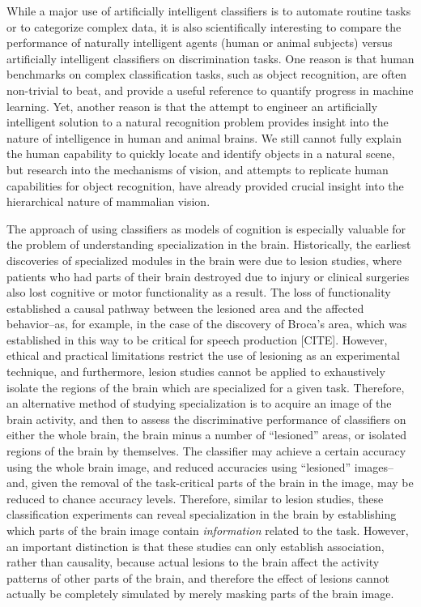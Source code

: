 While a major use of artificially intelligent classifiers is to
automate routine tasks or to categorize complex data, it is also
scientifically interesting to compare the performance of naturally
intelligent agents (human or animal subjects) versus artificially
intelligent classifiers on discrimination tasks.  One reason is that human
benchmarks on complex classification tasks, such as object
recognition, are often non-trivial to beat, and provide a useful
reference to quantify progress in machine learning.  Yet, another
reason is that the attempt to engineer an artificially intelligent
solution to a natural recognition problem provides insight into the
nature of intelligence in human and animal brains.  We still cannot
fully explain the human capability to quickly locate and identify
objects in a natural scene, but research into the mechanisms of
vision, and attempts to replicate human capabilities for object
recognition, have already provided crucial insight into the
hierarchical nature of mammalian vision.  %

The approach of using classifiers as models of cognition is especially
valuable for the problem of understanding specialization in the brain.
Historically, the earliest discoveries of specialized modules in the
brain were due to lesion studies, where patients who had parts of
their brain destroyed due to injury or clinical surgeries also lost
cognitive or motor functionality as a result.  The loss of
functionality established a causal pathway between the lesioned area
and the affected behavior--as, for example, in the case of the
discovery of Broca's area, which was established in this way to be
critical for speech production [CITE].  However, ethical and practical
limitations restrict the use of lesioning as an experimental
technique, and furthermore, lesion studies cannot be applied to
exhaustively isolate the regions of the brain which are specialized
for a given task.  
Therefore, an alternative method of studying specialization is to
acquire an image of the brain activity, and then to assess the
discriminative performance of classifiers on either the whole brain,
the brain minus a number of ``lesioned'' areas, or isolated regions of
the brain by themselves.  The classifier may achieve a certain
accuracy using the whole brain image, and reduced accuracies using
``lesioned'' images--and, given the removal of the task-critical parts
of the brain in the image, may be reduced to chance accuracy levels.
Therefore, similar to lesion studies, these classification experiments
can reveal specialization in the brain by establishing which parts of
the brain image contain \emph{information} related to the task.
However, an important distinction is that these studies can only
establish association, rather than causality, because actual lesions
to the brain affect the activity patterns of other parts of the brain,
and therefore the effect of lesions cannot actually be completely
simulated by merely masking parts of the brain image.

